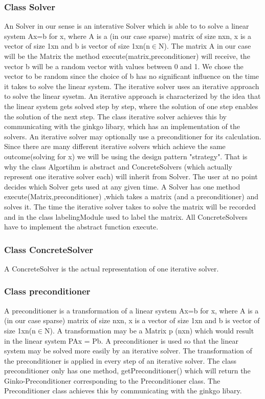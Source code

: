 \documentclass[parskip=full]{scrartcl}
\begin{document}
\subsubsection{Class Solver}
An Solver in our sense is an interative Solver which is able to to solve a linear system Ax=b for x, where A is a (in our case sparse) matrix of size nxn, x is a vector of size 1xn and b is vector of size 1xn(n$\in$N).
The matrix A in our case will be the Matrix the method execute(matrix,preconditioner) will receive, the vector b will be a random vector with values between 0 and 1.
We chose the vector to be random since the choice of b has no significant influence on the time it takes to solve the linear system.
The \gls{iterative solver} uses an iterative approach to solve the linear sysetm.
An iterative approach is characterized by the idea that the linear system gets solved step by step, where the solution of one step enables the solution of the next step.
The class \gls{iterative solver} achieves this by communicating with the ginkgo libary, which has an implementation of the solvers.
An \gls{iterative solver} may optionally use a \gls{preconditioner} for its calculation.
Since there are many different \gls{iterative solver}s which achieve the same outcome(solving for x) we will be using the design pattern "\gls{strategy}".
That is why the class Algortihm is abstract and ConcreteSolvers (which actually represent one \gls{iterative solver} each) will inherit from Solver.
The user at no point decides which Solver gets used at any given time. \newline
A Solver has one method execute(Matrix,\gls{preconditioner}) ,which takes a matrix (and a \gls{preconditioner}) and solves it.
The time the \gls{iterative solver} takes to solve the matrix will be recorded and in the class labelingModule used to label the matrix.
All ConcreteSolvers have to implement the abstract function execute.

\subsubsection{Class ConcreteSolver}
A ConcreteSolver is the actual representation of one \gls{iterative solver}.

\subsubsection{Class \gls{preconditioner}}
A \gls{preconditioner} is a transformation of a linear system Ax=b for x, where A is a (in our case sparse) matrix of size nxn, x is a vector of size 1xn and b is vector of size 1xn(n$\in$N).
A transformation may be a Matrix p (nxn) which would result in the linear system PAx = Pb.
A \gls{preconditioner} is used so that the linear system may be solved more easily by an \gls{iterative solver}.
The transformation of the \gls{preconditioner} is applied in every step of an \gls{iterative solver}. \newline\newline
The class \gls{preconditioner} only has one method, getPreconditioner() which will return the Ginko-Preconditioner corresponding to the Preconditioner class.
The Preconditioner class achieves this by communicating with the ginkgo libary.
\end{document}
